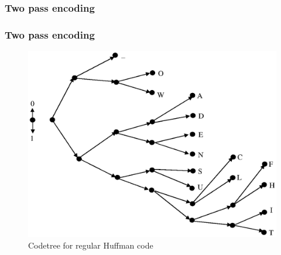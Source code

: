 \documentclass[14pt]{beamer}
\begin{document}
\begin{frame}
\frametitle{Two pass encoding}
\begin{itemize}    

    \begin{table}[htbp]
    \caption{Number of bits for regular code tree transmitting}
    \label{tab_bits_for_tree}
    \end{table}
    
\end{itemize}
\end{frame}



\begin{frame}
\frametitle{Two pass encoding}
\begin{itemize}    
    \begin{figure}[ht]
    \begin{minipage}{1.0\linewidth}
    \includegraphics[width=1.0\textwidth]{fig3_2.eps}
    \caption{Codetree for regular Huffman code}
    \label{HUF_tree_reg}
    \end{minipage}
    \end{figure}
    
\end{itemize}
\end{frame}
\end{document}
